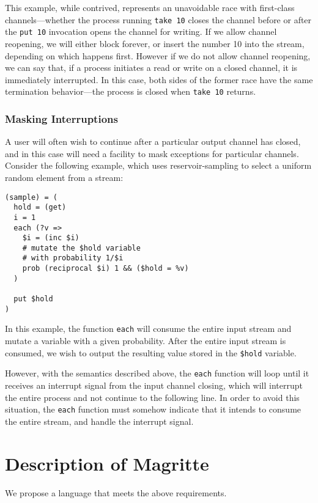 \documentclass[english,PRO]{ipsj}
\begin{document}
\noindent
This example, while contrived, represents an unavoidable race with first-class channels---whether the process running \verb/take 10/ closes the channel before or
after the \verb/put 10/ invocation opens the channel for writing. If we allow channel reopening, we will either block forever, or insert the number 10 into the stream, depending on which happens first. However if we do not allow channel reopening, we can say that, if a process initiates a read or write on a closed channel, it is immediately interrupted. In this case, both sides of the former race have the same termination behavior---the process is closed when \verb/take 10/ returns.

\subsubsection{Masking Interruptions}\label{masking}\noindent
A user will often wish to continue after a particular output channel has closed, and in this case will need a facility to mask exceptions for particular channels. Consider the following example, which uses reservoir-sampling to select a uniform random element from a stream:
\begin{lstlisting}
(sample) = (
  hold = (get)
  i = 1
  each (?v =>
    $i = (inc $i)
    # mutate the $hold variable
    # with probability 1/$i
    prob (reciprocal $i) 1 && ($hold = %v)
  )

  put $hold
)
\end{lstlisting}

\noindent
In this example, the function \verb/each/ will consume the entire input stream and mutate a variable with a given probability. After the entire input stream is consumed, we wish to output the resulting value stored in the \verb/$hold/ variable.

However, with the semantics described above, the \verb/each/ function will loop until it receives an interrupt signal from the input channel closing, which will interrupt the entire process and not continue to the following line. In order to avoid this situation, the \verb/each/ function must somehow indicate that it intends to consume the entire stream, and handle the interrupt signal.

\section{Description of Magritte}\label{description}\noindent
We propose a language that meets the above requirements.
\end{document}
